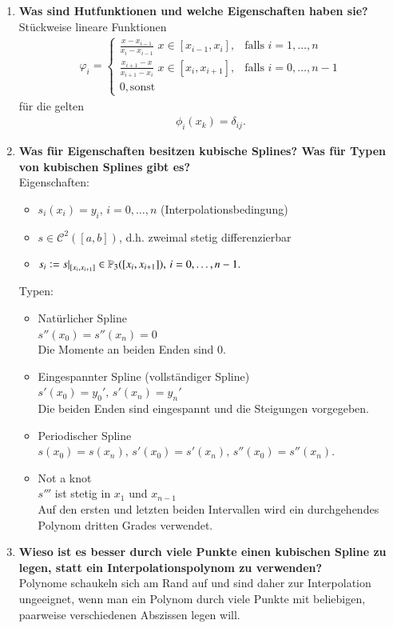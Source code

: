 \begin{enumerate}
		
		\item \textbf{Was sind Hutfunktionen und welche Eigenschaften haben sie?} \\
			Stückweise lineare Funktionen
			\begin{align*}
				\varphi_i=\begin{cases}
							\frac{x-x_{i-1}}{x_i-x_{i-1}}\,\,x\in[x_{i-1},x_i], & \text{falls } i=1,\dots,n \\
							\frac{x_{i+1}-x}{x_{i+1}-x_i}\,\,x\in[x_i,x_{i+1}], & \text{falls } i=0,\dots,n-1 \\
							0, \text{sonst}
						\end{cases}
			\end{align*}
			für die gelten
			\begin{align*}
				\phi_i(x_k)=\delta_{ij}.
			\end{align*}
		\item \textbf{Was für Eigenschaften besitzen kubische Splines? Was für Typen von kubischen Splines gibt es?} \\
			Eigenschaften:
			\begin{itemize}
				\item \(s_i(x_i)=y_i,\,i=0,\dots,n\) (Interpolationsbedingung)
				\item \(s\in\mathscr{C}^2([a,b])\), d.h. zweimal stetig differenzierbar
				\item \(s_i:=\eval[0]{s}_{[x_i,x_{i+1}]} \in \mathbb{P}_3([x_i,x_{i+1}]),\,i=0,\dots,n-1.\)
			\end{itemize}
			Typen:
			\begin{itemize}
				\item Natürlicher Spline \\
					\(s''(x_0)=s''(x_n)=0\) \\
					Die Momente an beiden Enden sind 0.
				\item Eingespannter Spline (vollständiger Spline) \\
					\(s'(x_0)=y_0',\,s'(x_n)=y_n'\) \\
					Die beiden Enden sind eingespannt und die Steigungen vorgegeben.
				\item Periodischer Spline \\
					\( s(x_0)=s(x_n),\,s'(x_0)=s'(x_n),\,s''(x_0)=s''(x_n) \).
				\item Not a knot \\
					\(s'''\) ist stetig in \(x_1\) und \(x_{n-1}\) \\
					Auf den ersten und letzten beiden Intervallen wird ein durchgehendes Polynom dritten Grades verwendet.
			\end{itemize}
		\item \textbf{Wieso ist es besser durch viele Punkte einen kubischen Spline zu legen, statt ein Interpolationspolynom zu verwenden?} \\
			Polynome schaukeln sich am Rand auf und sind daher zur Interpolation ungeeignet, wenn man ein Polynom durch viele Punkte mit beliebigen, paarweise verschiedenen Abszissen legen will.
		

\end{enumerate}
